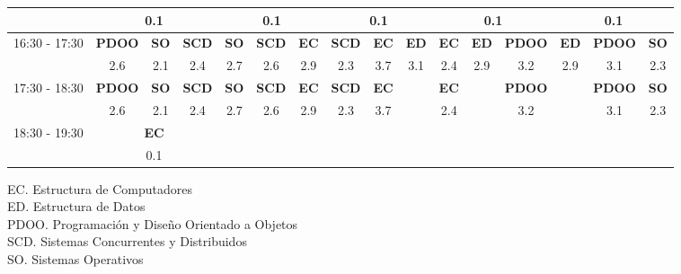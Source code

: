 \documentclass[10pt,spanish, landscape]{article}
\begin{document}
\begin{minipage}{0.7\textwidth}
\begin{tabular}{|c|ccc|ccc|ccc|ccc|ccc|}
& \multicolumn{3}{|c|}{ \cellcolor{grisclaro} {\footnotesize 0.1}}& \multicolumn{3}{|c|}{ \cellcolor{grisclaro} {\footnotesize 0.1}}& \multicolumn{3}{|c|}{ \cellcolor{grisclaro} {\footnotesize 0.1}}& \multicolumn{3}{|c|}{ \cellcolor{grisclaro} {\footnotesize 0.1}}& \multicolumn{3}{|c|}{ \cellcolor{grisclaro} {\footnotesize 0.1}}\\ 
 \hline
\multirow{2}{*}{16:30 - 17:30}  & \textbf{PDOO} & \textbf{SO} & \textbf{SCD} & \textbf{SO} & \textbf{SCD} & \textbf{EC} & \textbf{SCD} & \textbf{EC} & \textbf{ED} & \textbf{EC} & \textbf{ED} & \textbf{PDOO} & \textbf{ED} & \textbf{PDOO} & \textbf{SO}\\ 
 & {\footnotesize 2.6} & {\footnotesize 2.1} & {\footnotesize 2.4} & {\footnotesize 2.7} & {\footnotesize 2.6} & {\footnotesize 2.9} & {\footnotesize 2.3} & {\footnotesize 3.7} & {\footnotesize 3.1} & {\footnotesize 2.4} & {\footnotesize 2.9} & {\footnotesize 3.2} & {\footnotesize 2.9} & {\footnotesize 3.1} & {\footnotesize 2.3}\\ 
 \hline
\multirow{2}{*}{17:30 - 18:30}  & \textbf{PDOO} & \textbf{SO} & \textbf{SCD} & \textbf{SO} & \textbf{SCD} & \textbf{EC} & \textbf{SCD} & \textbf{EC} & \textbf{} & \textbf{EC} & \textbf{} & \textbf{PDOO} & \textbf{} & \textbf{PDOO} & \textbf{SO}\\ 
 & {\footnotesize 2.6} & {\footnotesize 2.1} & {\footnotesize 2.4} & {\footnotesize 2.7} & {\footnotesize 2.6} & {\footnotesize 2.9} & {\footnotesize 2.3} & {\footnotesize 3.7} & {\footnotesize } & {\footnotesize 2.4} & {\footnotesize } & {\footnotesize 3.2} & {\footnotesize } & {\footnotesize 3.1} & {\footnotesize 2.3}\\ 
 \hline
\multirow{2}{*}{18:30 - 19:30} & \multicolumn{3}{|c|}{ \cellcolor{grisclaro} \textbf{EC}} &  &  &  &  &  &  &  &  &  &  &  & \\ 
& \multicolumn{3}{|c|}{ \cellcolor{grisclaro} {\footnotesize 0.1}} &  &  &  &  &  &  &  &  &  &  &  & \\ 
 \hline

\end{tabular}
\end{minipage}
\begin{minipage}{0.25\textwidth}
EC. Estructura de Computadores\\[0.5cm]
ED. Estructura de Datos\\[0.5cm]
PDOO. Programación y Diseño Orientado a Objetos\\[0.5cm]
SCD. Sistemas Concurrentes y Distribuidos\\[0.5cm]
SO. Sistemas Operativos\\[0.5cm]
\end{minipage}
\newpage
\end{document}
